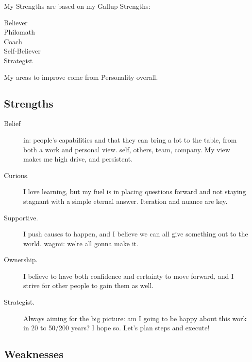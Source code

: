 \documentclass[10pt, a4paper, twocolumn]{article}
\begin{document}
My Strengths are based on my Gallup Strengths:
\begin{description}
 \item [Believer]
 \item [Philomath]
 \item [Coach]
 \item [Self-Believer]
 \item [Strategist]
\end{description}

\noindent
My areas to improve come from Personality overall.

\subsection*{Strengths}

\begin{description}
 \item[Belief] in: people's capabilities and that they can bring a lot to the table, from both a work and personal view.
 self, others, team, company.
 My view %
 makes me %
 high drive, and persistent.
\item[Curious.] I love learning, but my fuel is in placing questions forward and not staying stagnant with a simple eternal answer. Iteration and nuance are key.
\item[Supportive.] I push causes to happen, and I believe we can all give something out to the world. wagmi: we're all gonna make it.
\item[Ownership.] I believe to have both confidence and certainty to move forward, and I strive for other people to gain them as well.
\item[Strategist.] Always aiming for the big picture: am I going to be happy about this work in 20 to 50/200 years? I hope so. Let's plan steps and execute!
 \end{description}

\subsection*{Weaknesses}
\end{document}
